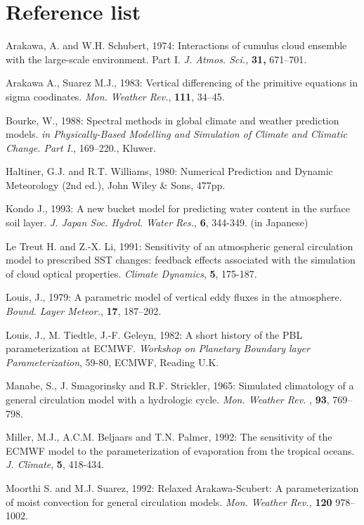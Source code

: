 \hypertarget{reference-list}{%
\section{Reference list}\label{reference-list}}

Arakawa, A. and W.H. Schubert, 1974: Interactions of cumulus cloud
ensemble with the large-scale environment. Part I. {\emph{J. Atmos.
Sci.,}} {\textbf{31,}} 671--701.

Arakawa A., Suarez M.J., 1983: Vertical differencing of the primitive
equations in sigma coodinates. {\emph{Mon. Weather Rev.}},
{\textbf{111}}, 34--45.

Bourke, W., 1988: Spectral methods in global climate and weather
prediction models. {\emph{in Physically-Based Modelling and Simulation
of Climate and Climatic Change. Part I.}}, 169--220., Kluwer.

Haltiner, G.J. and R.T. Williams, 1980: Numerical Prediction and Dynamic
Meteorology (2nd ed.), John Wiley \& Sons, 477pp.

Kondo J., 1993: A new bucket model for predicting water content in the
surface soil layer. {\emph{J. Japan Soc. Hydrol. Water Res.}},
{\textbf{6}}, 344-349. (in Japanese)

Le Treut H. and Z.-X. Li, 1991: Sensitivity of an atmospheric general
circulation model to prescribed SST changes: feedback effects associated
with the simulation of cloud optical properties. {\emph{Climate
Dynamics}}, {\textbf{5}}, 175-187.

Louis, J., 1979: A parametric model of vertical eddy fluxes in the
atmosphere. {\emph{Bound. Layer Meteor.}}, {\textbf{17}}, 187--202.

Louis, J., M. Tiedtle, J.-F. Geleyn, 1982: A short history of the PBL
parameterization at ECMWF. {\emph{Workshop on Planetary Boundary layer
Parameterization}}, 59-80, ECMWF, Reading U.K.

Manabe, S., J. Smagorinsky and R.F. Strickler, 1965: Simulated
climatology of a general circulation model with a hydrologic cycle.
{\emph{Mon. Weather Rev.}} , {\textbf{93}}, 769--798.

Miller, M.J., A.C.M. Beljaars and T.N. Palmer, 1992: The sensitivity of
the ECMWF model to the parameterization of evaporation from the tropical
oceans. {\emph{J. Climate}}, {\textbf{5}}, 418-434.

Moorthi S. and M.J. Suarez, 1992: Relaxed Arakawa-Scubert: A
parameterization of moist convection for general circulation models.
{\emph{Mon. Weather Rev.,}} {\textbf{120}} 978--1002.

